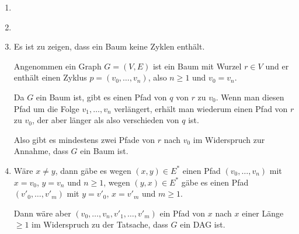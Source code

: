 \documentclass[12pt]{article}
\begin{document}
\begin{loesung}
  \begin{enumerate}
  \item
     \\[3mm]
  \item
     \\[3mm]
  \item Es ist zu zeigen, dass ein Baum keine Zyklen enthält.

    Angenommen ein Graph $G=(V,E)$ ist ein Baum mit Wurzel $r\in V$
    und er enthält einen Zyklus $p=(v_0,\dots,v_n)$, also $n\geq 1$
    und $v_0=v_n$.

    Da $G$ ein Baum ist, gibt es einen Pfad von $q$ von $r$ zu $v_0$.
    Wenn man diesen Pfad um die Folge $v_1, \dots,v_n$ verlängert,
    erhält man wiederum einen Pfad von $r$ zu $v_0$, der aber länger
    als also verschieden von $q$ ist.

    Also gibt es mindestens zwei Pfade von $r$ nach $v_0$ im
    Widerspruch zur Annahme, dass $G$ ein Baum ist.
  \item Wäre $x\not= y$, dann gäbe es wegen $(x,y)\in E^*$ einen Pfad
    $(v_0,\dots,v_n)$ mit $x=v_0$, $y=v_n$ und $n\geq 1$, wegen
    $(y,x)\in E^*$ gäbe es einen Pfad $(v'_0,\dots,v'_m)$ mit $y=v'_0$,
    $x=v'_m$ und $m\geq 1$.

    Dann wäre aber $(v_0,\dots, v_n, v'_1, \dots, v'_m)$ ein Pfad von
    $x$ nach $x$ einer Länge $\geq 1$ im Widerspruch zu der Tatsache,
    dass $G$ ein DAG ist.
  \end{enumerate}
\end{loesung}

\end{document}
